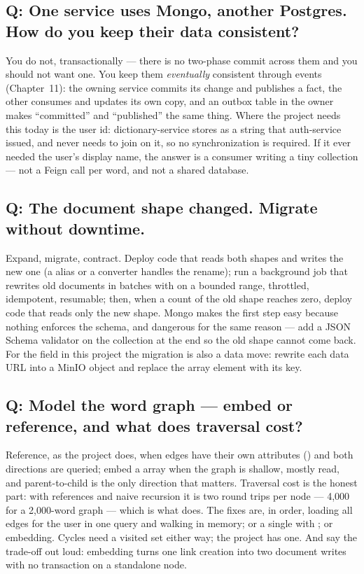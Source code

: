 \subsection*{Q: One service uses Mongo, another Postgres. How do you keep their data consistent?}

You do not, transactionally --- there is no two-phase commit across
them and you should not want one. You keep them \emph{eventually}
consistent through events (Chapter~11): the owning service commits its
change and publishes a fact, the other consumes and updates its own
copy, and an outbox table in the owner makes ``committed'' and
``published'' the same thing. Where the project needs this today is the
user id: dictionary-service stores  as a string
that auth-service issued, and never needs to join on it, so no
synchronization is required. If it ever needed the user's display name,
the answer is a  consumer writing a tiny
 collection --- not a Feign call per word, and not a shared
database.

\subsection*{Q: The document shape changed. Migrate without downtime.}

Expand, migrate, contract. Deploy code that reads both shapes and
writes the new one (a  alias or a converter handles the
rename); run a background job that rewrites old documents in batches
with  on a bounded  range, throttled,
idempotent, resumable; then, when a count of the old shape reaches
zero, deploy code that reads only the new shape. Mongo makes the first
step easy because nothing enforces the schema, and dangerous for the
same reason --- add a JSON Schema validator on the collection at the
end so the old shape cannot come back. For the  field in
this project the migration is also a data move: rewrite each data URL
into a MinIO object and replace the array element with its key.

\subsection*{Q: Model the word graph --- embed or reference, and what does traversal cost?}

Reference, as the project does, when edges have their own attributes
() and both directions are queried; embed a
 array when the graph is shallow, mostly read, and
parent-to-child is the only direction that matters. Traversal cost is
the honest part: with references and naive recursion it is two round
trips per node --- 4{,}000 for a 2{,}000-word graph --- which is what
 does. The fixes are, in order, loading all edges
for the user in one query and walking in memory; or a single
 with ; or embedding. Cycles need a
visited set either way; the project has one. And say the trade-off out
loud: embedding turns one link creation into two document writes with
no transaction on a standalone node.

